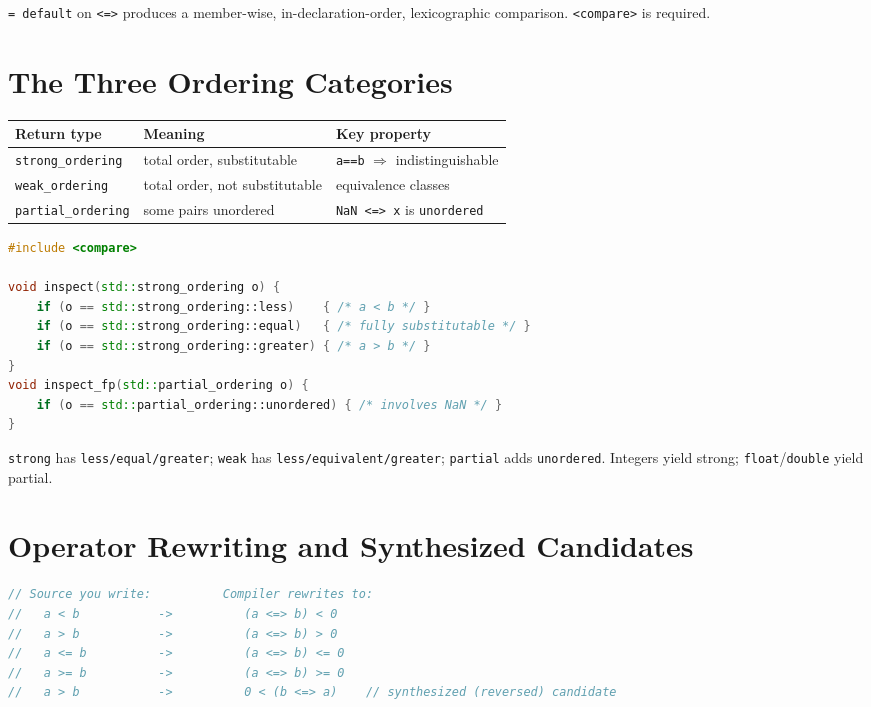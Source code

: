 \texttt{= default} on \texttt{<=>} produces a member-wise, in-declaration-order, lexicographic comparison. \texttt{<compare>} is required.

\section{The Three Ordering Categories}
\label{sec:c20-ordering-categories}

\begin{center}
\begin{tabular}{lll}
\hline
\textbf{Return type} & \textbf{Meaning} & \textbf{Key property} \\
\hline
\texttt{strong\_ordering} & total order, substitutable & \texttt{a==b} $\Rightarrow$ indistinguishable \\
\texttt{weak\_ordering} & total order, not substitutable & equivalence classes \\
\texttt{partial\_ordering} & some pairs unordered & \texttt{NaN <=> x} is \texttt{unordered} \\
\hline
\end{tabular}
\end{center}

\begin{lstlisting}[language=C++,caption={The named result values of each category}]
#include <compare>

void inspect(std::strong_ordering o) {
    if (o == std::strong_ordering::less)    { /* a < b */ }
    if (o == std::strong_ordering::equal)   { /* fully substitutable */ }
    if (o == std::strong_ordering::greater) { /* a > b */ }
}
void inspect_fp(std::partial_ordering o) {
    if (o == std::partial_ordering::unordered) { /* involves NaN */ }
}
\end{lstlisting}

\texttt{strong} has \texttt{less/equal/greater}; \texttt{weak} has \texttt{less/equivalent/greater}; \texttt{partial} adds \texttt{unordered}. Integers yield strong; \texttt{float}/\texttt{double} yield partial.

\section{Operator Rewriting and Synthesized Candidates}
\label{sec:c20-operator-rewriting}

\begin{lstlisting}[language=C++,caption={How the compiler rewrites relational operators}]
// Source you write:          Compiler rewrites to:
//   a < b           ->          (a <=> b) < 0
//   a > b           ->          (a <=> b) > 0
//   a <= b          ->          (a <=> b) <= 0
//   a >= b          ->          (a <=> b) >= 0
//   a > b           ->          0 < (b <=> a)    // synthesized (reversed) candidate
\end{lstlisting}

